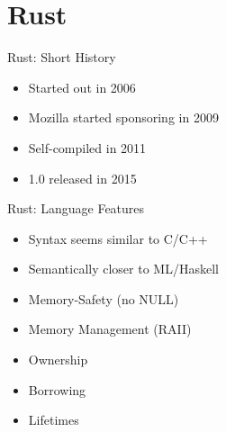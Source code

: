 \section{Rust}


\begin{frame}[c]{Rust: Short History}
    \Large
    \begin{itemize}[<+(1)->]
        \item Started out in 2006
        \item Mozilla started sponsoring in 2009
        \item Self-compiled in 2011
        \item 1.0 released in 2015
    \end{itemize}
\end{frame}

\begin{frame}[c]{Rust: Language Features}
    \Large
    \begin{itemize}[<+(1)->]
        \item Syntax seems similar to C/C++
        \item Semantically closer to ML/Haskell
        \item Memory-Safety (no NULL)
        \item Memory Management (RAII)
        \item Ownership
        \item Borrowing
        \item Lifetimes
    \end{itemize}
\end{frame}




